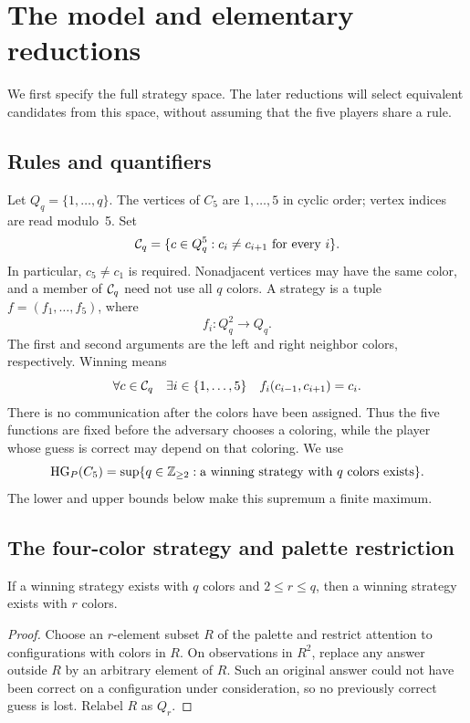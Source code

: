 \section{The model and elementary reductions}\label{sec:preliminaries}
We first specify the full strategy space. The later reductions will select
equivalent candidates from this space, without assuming that the five
players share a rule.
\subsection{Rules and quantifiers}
Let $Q_q=\{1,\ldots,q\}$. The vertices of $C_5$ are $1,\ldots,5$ in cyclic
order; vertex indices are read modulo~5. Set
\[
\mathcal{C}_q=\{c\in Q_q^5:c_i\ne c_{i+1}\text{ for every }i\}.
\]
In particular, $c_5\ne c_1$ is required. Nonadjacent vertices may have the
same color, and a member of $\mathcal{C}_q$ need not use all $q$ colors. A
strategy is a tuple $f=(f_1,\ldots,f_5)$, where
\[
f_i:Q_q^2\longrightarrow Q_q.
\]
The first and second arguments are the left and right neighbor colors,
respectively. Winning means
\begin{equation}\label{eq:winning}
\forall c\in\mathcal{C}_q\quad
\exists i\in\{1,\ldots,5\}\quad
f_i(c_{i-1},c_{i+1})=c_i.
\end{equation}
There is no communication after the colors have been assigned.
Thus the five functions are fixed before the adversary chooses a coloring,
while the player whose guess is correct may depend on that coloring.
We use
\[
\operatorname{HG}_{P}(C_5)=\sup\{q\in\mathbb Z_{\geq2}:\text{a winning strategy with $q$ colors exists}\}.
\]
The lower and upper bounds below make this supremum a finite maximum.

\subsection{The four-color strategy and palette restriction}
\begin{lemma}\label{lem:palette}
If a winning strategy exists with $q$ colors and $2\leq r\leq q$, then a
winning strategy exists with $r$ colors.
\end{lemma}
\begin{proof}
Choose an $r$-element subset $R$ of the palette and restrict attention to
configurations with colors in $R$. On observations in $R^2$, replace any
answer outside $R$ by an arbitrary element of $R$. Such an original answer
could not have been correct on a configuration under consideration, so no
previously correct guess is lost. Relabel $R$ as $Q_r$.
\end{proof}

